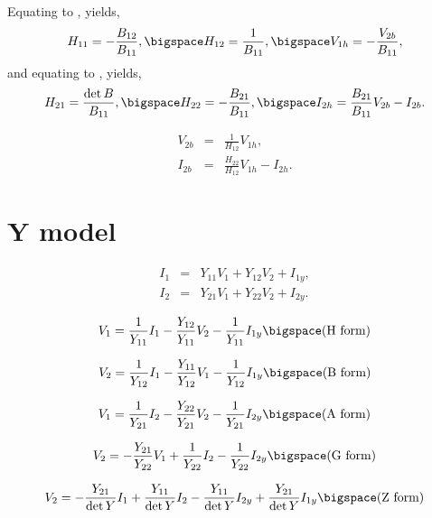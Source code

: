 \documentclass[a4paper, 12pt]{article}
\begin{document}
Equating  to , yields,
%
\begin{equation}
  H_{11} = -\frac{B_{12}}{B_{11}}, \bigspace H_{12} = \frac{1}{B_{11}}, \bigspace V_{1h} = -\frac{V_{2b}}{B_{11}},
\end{equation}
%
and equating to , yields,
%
\begin{equation}
  H_{21} = \frac{\det{B}}{B_{11}}, \bigspace H_{22} = -\frac{B_{21}}{B_{11}}, \bigspace I_{2h} = \frac{B_{21}}{B_{11}} V_{2b} - I_{2b}.
\end{equation}


\begin{eqnarray}
  V_{2b} & = & \frac{1}{H_{12}} V_{1h}, \\
  I_{2b} & = & \frac{H_{22}}{H_{12}} V_{1h} - I_{2h}.
\end{eqnarray}




\section{Y model}

\begin{eqnarray}
\label{eqn:YI1}
  I_1 & = & Y_{11} V_1 + Y_{12} V_2 + I_{1y}, \\
  I_2 & = & Y_{21} V_1 + Y_{22} V_2 + I_{2y}.
\label{eqn:YI2}
\end{eqnarray}



\begin{equation}
  V_1 = \frac{1}{Y_{11}} I_1 - \frac{Y_{12}}{Y_{11}} V_2 - \frac{1}{Y_{11}} I_{1y} \bigspace \mbox{(H form)}
\end{equation}

\begin{equation}
  V_2 = \frac{1}{Y_{12}} I_1 - \frac{Y_{11}}{Y_{12}} V_1 - \frac{1}{Y_{12}} I_{1y} \bigspace \mbox{(B form)}
\end{equation}

\begin{equation}
  V_1 = \frac{1}{Y_{21}} I_2 - \frac{Y_{22}}{Y_{21}} V_2 - \frac{1}{Y_{21}} I_{2y} \bigspace \mbox{(A form)}
\end{equation}


\begin{equation}
  V_2 = -\frac{Y_{21}}{Y_{22}} V_1 + \frac{1}{Y_{22}} I_2 - \frac{1}{Y_{22}} I_{2y} \bigspace \mbox{(G form)}
\end{equation}


\begin{equation}
  V_2 = -\frac{Y_{21}}{\det{Y}} I_1 + \frac{Y_{11}}{\det{Y}} I_2 - \frac{Y_{11}}{\det{Y}} I_{2y} + \frac{Y_{21}}{\det{Y}} I_{1y} \bigspace \mbox{(Z form)}
\end{equation}
\end{document}
